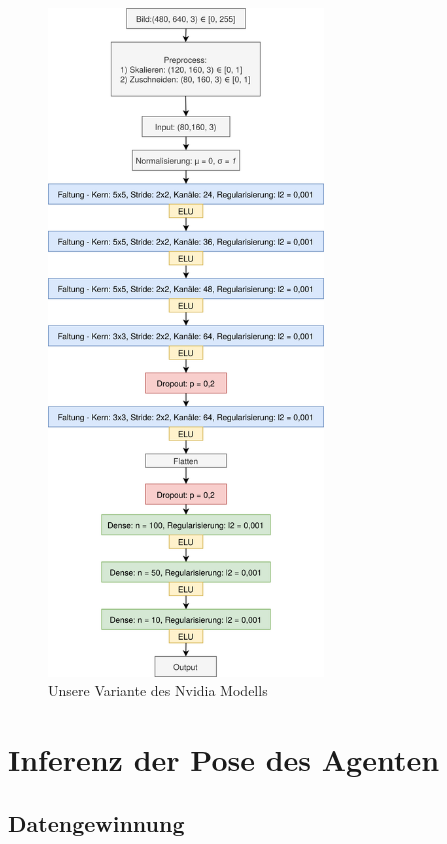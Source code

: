 \begin{figure}[H]
	\centering
	\includegraphics[width=0.65\textwidth]{kapitel4/images/drawio.png}
	\caption{Unsere Variante des Nvidia Modells}
	\label{nvidia-model}
	\vspace{0.2cm}
\end{figure}


\section{Inferenz der Pose des Agenten}

\subsection{Datengewinnung}

